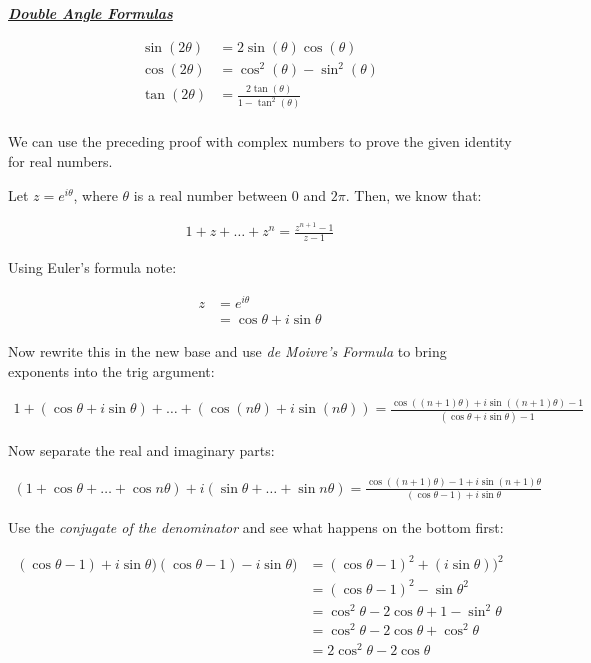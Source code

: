 \begin{enumerate}
	      \underline{{\textit{\textbf{Double Angle Formulas}}}}

	      \begin{align*}
		      \sin(2\theta) & = 2\sin(\theta)\cos(\theta)                \\
		      \cos(2\theta) & = \cos^2(\theta) - \sin^2(\theta)          \\
		      \tan(2\theta) & = \frac{2\tan(\theta)}{1 - \tan^2(\theta)} \\
	      \end{align*}


	      We can use the preceding proof with complex numbers to prove the given identity for real numbers.

	      Let $z = e^{i\theta}$, where $\theta$ is a real number between $0$ and $2\pi$. Then, we know that:

	      \begin{align*}
		      1 + z + \dots + z^n = \frac{z^{n + 1} - 1}{z - 1}
	      \end{align*}

	      Using Euler's formula note:

	      \begin{align*}
		      z & = e^{i\theta}              \\
		        & = \cos\theta + i\sin\theta
	      \end{align*}

	      Now rewrite this in the new base and use \emph{de Moivre's Formula} to bring exponents
	      into the trig argument:

	      \begin{align*}
		      1 + (\cos\theta + i\sin\theta) + \dots + (\cos(n\theta) + i\sin(n\theta))
		      = \frac{\cos((n + 1)\theta) + i\sin((n + 1)\theta) - 1}{(\cos\theta + i\sin\theta) - 1}
	      \end{align*}

	      Now separate the real and imaginary parts:

	      \begin{align*}
		      (1 + \cos\theta + \dots + \cos n\theta) + i(\sin\theta + \dots + \sin n\theta)
		      = \frac{\cos((n + 1)\theta) - 1 + i\sin(n + 1)\theta}{(\cos\theta - 1) + i\sin\theta}
	      \end{align*}

	      Use the \textit{conjugate of the denominator} and see what happens on the bottom first:

	      \begin{align*}
		      (\cos\theta - 1) + i\sin\theta) (\cos\theta - 1) - i\sin\theta)
		       & = (\cos\theta - 1)^2 + (i\sin\theta))^2            \\
		       & = (\cos\theta - 1)^2 - \sin\theta^2                \\
		       & = \cos^2 \theta - 2\cos \theta + 1 - \sin^2 \theta \\
		       & = \cos^2 \theta - 2\cos \theta + \cos^2 \theta     \\
		       & = 2\cos^2 \theta - 2\cos \theta                    \\
	      \end{align*}


\end{enumerate}

